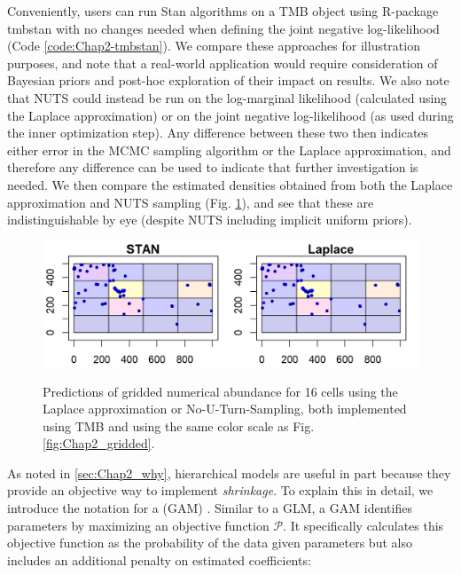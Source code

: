 Conveniently, users can run Stan algorithms on a TMB object using R-package \colorbox{backcolour}{tmbstan} \cite{monnahan_no-u-turn_2018} with no changes needed when defining the joint negative log-likelihood (Code \ref{code:Chap2-tmbstan}).  We compare these approaches for illustration purposes, and note that a real-world application would require consideration of Bayesian priors and post-hoc exploration of their impact on results.  We also note that NUTS could instead be run on the log-marginal likelihood (calculated using the Laplace approximation) or on the joint negative log-likelihood (as used during the inner optimization step).  Any difference between these two then indicates either error in the MCMC sampling algorithm or the Laplace approximation, and therefore any difference can be used to indicate that further investigation is needed.  We then compare the estimated densities obtained from both the Laplace approximation and NUTS sampling (Fig. \ref{fig:Chap2_predictions}), and see that these are indistinguishable by eye (despite NUTS including implicit uniform priors).


\lstset{style=Rcode}


\begin{figure}[!ht]
    \caption[Prediction of gridded abundance using Laplace approximation or STAN]{Predictions of gridded numerical abundance for 16 cells using the Laplace approximation or No-U-Turn-Sampling, both implemented using TMB and using the same color scale as Fig. \ref{fig:Chap2_gridded}.}
    \centering
    \includegraphics[width=5.5in]{Chap_2/gridded_predictions.png}
    \label{fig:Chap2_predictions}
\end{figure}

As noted in \ref{sec:Chap2_why}, hierarchical models are useful in part because they provide an objective way to implement \textit{shrinkage}.  To explain this in detail, we introduce the notation for a  (GAM) \cite{wood_generalized_2006,hastie_generalized_1990}.  Similar to a GLM, a GAM identifies parameters by maximizing an objective function \(\mathcal{P}\).  It specifically calculates this objective function as the probability of the data given parameters but also includes an additional penalty on estimated coefficients:

